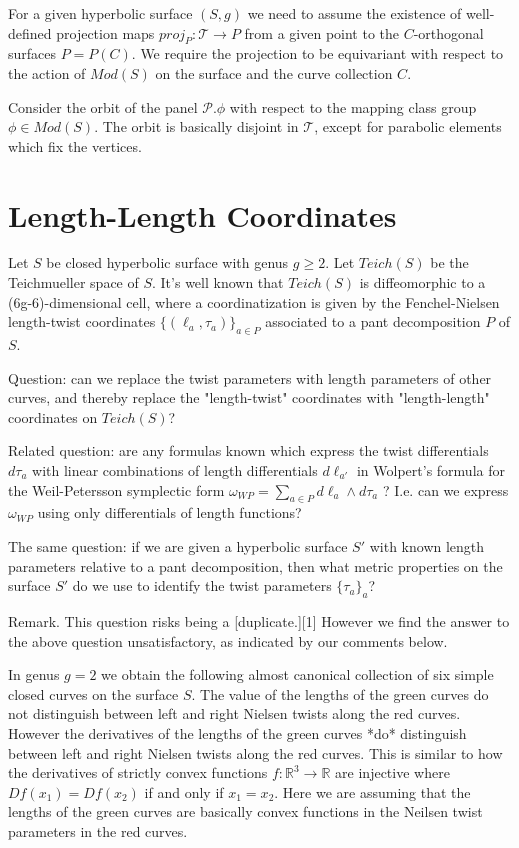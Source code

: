 \documentclass[12pt]{article}
\theoremstyle{definition}
\theoremstyle{remark}
\newcommand{\sT}{\mathscr{T}}
\newcommand{\sP}{\mathscr{P}}
\begin{document}
For a given hyperbolic surface $(S,g)$ we need to assume the existence of well-defined projection maps $proj_P: \sT \to P$ from a given point to the $C$-orthogonal surfaces $P=P(C)$. We require the projection to be equivariant with respect to the action of $Mod(S)$ on the surface and the curve collection $C$. 








Consider the orbit of the panel $\sP.\phi$ with respect to the mapping class group $\phi\in Mod(S)$. The orbit is basically disjoint in $\sT$, except for parabolic elements which fix the vertices.


\section{Length-Length Coordinates}

Let $S$ be closed hyperbolic surface with genus $g\geq 2$. Let $Teich(S)$ be the Teichmueller space of $S$. It's well known that $Teich(S)$ is diffeomorphic to a (6g-6)-dimensional cell, where a coordinatization is given by the Fenchel-Nielsen length-twist coordinates $\{(\ell_a, \tau_a) \}_{a\in P}$ associated to a pant decomposition $P$ of $S$. 

Question: can we replace the twist parameters with length parameters of other curves, and thereby replace the "length-twist" coordinates with "length-length" coordinates on $Teich(S)$? 

Related question: are any formulas known which express the twist differentials $d\tau_a$ with linear combinations of length differentials $d\ell_{a'}$ in Wolpert's formula for the Weil-Petersson symplectic form $\omega_{WP}=\sum_{a\in P} d\ell_a \wedge d \tau_a$ ? I.e. can we express $\omega_{WP}$ using only differentials of length functions? 

The same question: if we are given a hyperbolic surface $S'$ with known length parameters relative to a pant decomposition, then what metric properties on the surface $S'$ do we use to identify the twist parameters $\{\tau_a\}_a$?  

Remark. This question risks being a [duplicate.][1] However we find the answer to the above question unsatisfactory, as indicated by our comments below. 

In genus $g=2$ we obtain the following almost canonical collection of six simple closed curves on the surface $S$. The value of the lengths of the green curves do not distinguish between left and right Nielsen twists along the red curves. However the derivatives of the lengths of the green curves *do* distinguish between left and right Nielsen twists along the red curves. This is similar to how the derivatives of strictly convex functions $f: \mathbb{R}^3 \to \mathbb{R}$ are injective where $Df(x_1)=Df(x_2)$ if and only if $x_1=x_2$. Here we are assuming that the lengths of the green curves are basically convex functions in the Neilsen twist parameters in the red curves.
\end{document}
